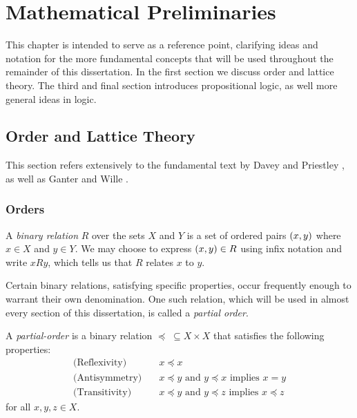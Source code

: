 \chapter{Mathematical Preliminaries}
\label{chapter:mathematical-preliminaries}

This chapter is intended to serve as a reference point, clarifying ideas and notation for the more fundamental concepts that will be used throughout the remainder of this dissertation. In the first section we discuss order and lattice theory. The third and final section introduces propositional logic, as well more general ideas in logic.

\section{Order and Lattice Theory}
\label{section:order-theory}

This section refers extensively to the fundamental text by Davey and Priestley \cite{davey2002introduction}, as well as Ganter and Wille \cite{ganter1999formal}.

\subsection{Orders}
\label{subsection:orders}

A \textit{binary relation}  $R$ over the sets $X$ and $Y$ is a set of ordered pairs $(x,y)$ where $x \in X$ and $y \in Y$. We may choose to express $(x,y) \in R$ using infix notation and write $xRy$, which tells us that $R$ relates $x$ to $y$.
 
Certain binary relations, satisfying specific properties, occur frequently enough to warrant their own denomination. One such relation, which will be used in almost every section of this dissertation, is called a \textit{partial order}.

\begin{definition}
  \label{definition:partial-order}
  A \textit{partial-order}  is a binary relation $\preceq \; \subseteq X \times X$ that satisfies the following properties:
  \begin{align}
    \text{(Reflexivity)} \quad & x \preceq x \\
    \text{(Antisymmetry)} \quad & x \preceq y \text{ and } y \preceq x \text{ implies } x = y \\
    \text{(Transitivity)} \quad & x \preceq y \text{ and } y \preceq z \text{ implies } x \preceq z
  \end{align}
  for all $x,y,z \in X$.
\end{definition}


